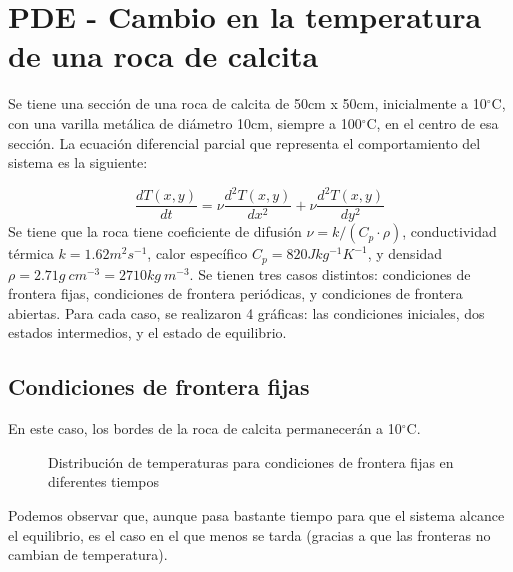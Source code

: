 \documentclass{article}
\begin{document}
\section{PDE - Cambio en la temperatura de una roca de calcita}
Se tiene una sección de una roca de calcita de 50cm x 50cm, inicialmente a 10$^\circ$C, con una varilla metálica de diámetro 10cm, siempre a 100$^\circ$C, en el centro de esa sección. La ecuación diferencial parcial que representa el comportamiento del sistema es la siguiente:

\begin{equation}
    \frac{dT(x,y)}{dt} = \nu\frac{d^{2}T(x,y)}{dx^{2}} + \nu\frac{d^{2}T(x,y)}{dy^{2}} 
\end{equation}
Se tiene que la roca tiene coeficiente de difusión $\nu = k/(C_p\cdot\rho)$, conductividad térmica $k = 1.62m^2s^{-1}$, calor específico $C_p = 820Jkg^{-1}K^{-1}$, y densidad $\rho = 2.71g\ cm^{-3} = 2710kg\ m^{-3}$. Se tienen tres casos distintos: condiciones de frontera fijas, condiciones de frontera periódicas, y condiciones de frontera abiertas. Para cada caso, se realizaron 4 gráficas: las condiciones iniciales, dos estados intermedios, y el estado de equilibrio.

\subsection*{Condiciones de frontera fijas}
En este caso, los bordes de la roca de calcita permanecerán a 10$^\circ$C.

\begin{figure}[H]
    \centering
    \label{fig:my_label}
\end{figure}
\begin{figure}[H]
    \centering
        \caption{Distribución de temperaturas para condiciones de frontera fijas en diferentes tiempos}
    \label{fig:my_label}
\end{figure}

Podemos observar que, aunque pasa bastante tiempo para que el sistema alcance el equilibrio, es el caso en el que menos se tarda (gracias a que las fronteras no cambian de temperatura).
\end{document}
